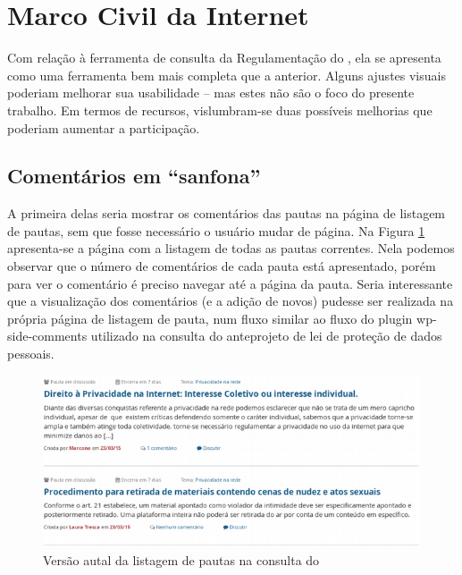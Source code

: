\section{Marco Civil da Internet}
Com relação à ferramenta de consulta da Regulamentação do \mc, ela se apresenta como uma ferramenta bem mais completa que a anterior. Alguns ajustes visuais poderiam melhorar sua usabilidade – mas estes não são o foco do presente trabalho. Em termos de recursos, vislumbram-se duas possíveis melhorias que poderiam aumentar a participação.

\subsection{Comentários em ``sanfona''}
A primeira delas seria mostrar os comentários das pautas na página de listagem de pautas, sem que fosse necessário o usuário mudar de página. Na Figura \ref{fig:pautas-mcivil-hj} apresenta-se a página com a listagem de todas as pautas correntes. Nela podemos observar que o número de comentários de cada pauta está apresentado, porém para ver o comentário é preciso navegar até a página da pauta. Seria interessante que a visualização dos comentários (e a adição de novos) pudesse ser realizada na própria página de listagem de pauta, num fluxo similar ao fluxo do plugin wp-side-comments utilizado na consulta do anteprojeto de lei de proteção de dados pessoais.
    \begin{figure}[htb]%
        \begin{center}
            \includegraphics[scale=0.7]{./imagens/mcivil-atual-listagem.png}%
        \end{center}%
        \caption{Versão autal da listagem de pautas na consulta do \mc \label{fig:pautas-mcivil-hj}}%
    \end{figure}%
    
